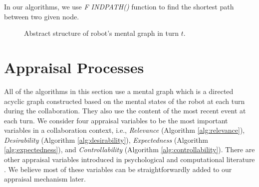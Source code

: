 \documentclass{aamas2016}
\begin{document}
In our algorithms, we use \textit{F{\fontsize{8}{8}\selectfont
IND}P{\fontsize{8}{8}\selectfont ATH}()} function to find the shortest path
between two given node. 

\begin{figure}
\begin{center}
\caption{{\fontsize{9}{9}\selectfont Abstract structure of robot's mental graph
in turn $t$.}}
\label{fig:mg}
\end{center}
\vspace*{-6mm}
\end{figure}

\vspace*{-2mm}
\section{Appraisal Processes}
\label{sec:appraisal-process}

All of the algorithms in this section use a mental graph which is a directed
acyclic graph constructed based on the mental states of the robot at each turn
during the collaboration. They also use the content of the most recent event at
each turn. We consider four appraisal variables to be the most important
variables in a collaboration context, i.e., \textit{Relevance} (Algorithm
\ref{alg:relevance}), \textit{Desirability} (Algorithm \ref{alg:desirability}),
\textit{Expectedness} (Algorithm \ref{alg:expectedness}), and
\textit{Controllability} (Algorithm \ref{alg:controllability}). There are other
appraisal variables introduced in psychological
\cite{scherer:appraisal-processes} and computational literature
\cite{gratch:domain-independent}. We believe most of these variables can be
straightforwardly added to our appraisal mechanism later.
\end{document}
